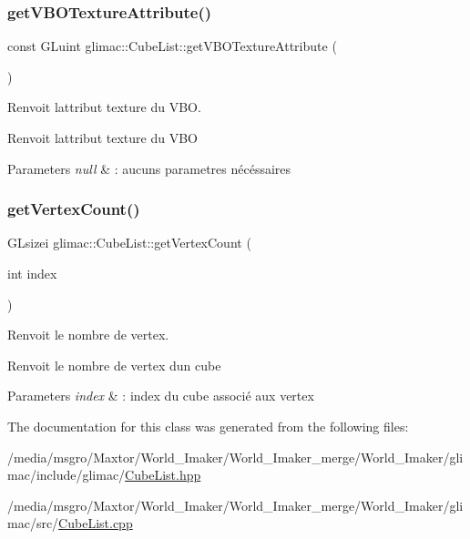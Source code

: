 \subsubsection{\texorpdfstring{get\+V\+B\+O\+Texture\+Attribute()}{getVBOTextureAttribute()}}
{\footnotesize\ttfamily const G\+Luint glimac\+::\+Cube\+List\+::get\+V\+B\+O\+Texture\+Attribute (\begin{DoxyParamCaption}{ }\end{DoxyParamCaption})\hspace{0.3cm}{\ttfamily [inline]}}



Renvoit l\textquotesingle{}attribut texture du V\+BO. 

Renvoit l\textquotesingle{}attribut texture du V\+BO


\begin{DoxyParams}{Parameters}
{\em null} & \+: aucuns parametres nécéssaires \\
\hline
\end{DoxyParams}
\mbox{\label{classglimac_1_1CubeList_aba84c9ac9d87bedca07244b8d4525c1d}} 
\subsubsection{\texorpdfstring{get\+Vertex\+Count()}{getVertexCount()}}
{\footnotesize\ttfamily G\+Lsizei glimac\+::\+Cube\+List\+::get\+Vertex\+Count (\begin{DoxyParamCaption}\item[{int}]{index }\end{DoxyParamCaption})\hspace{0.3cm}{\ttfamily [inline]}}



Renvoit le nombre de vertex. 

Renvoit le nombre de vertex d\textquotesingle{}un cube


\begin{DoxyParams}{Parameters}
{\em index} & \+: index du cube associé aux vertex \\
\hline
\end{DoxyParams}


The documentation for this class was generated from the following files\+:\begin{DoxyCompactItemize}
\item 
/media/msgro/\+Maxtor/\+World\+\_\+\+Imaker/\+World\+\_\+\+Imaker\+\_\+merge/\+World\+\_\+\+Imaker/glimac/include/glimac/\hyperlink{CubeList_8hpp}{Cube\+List.\+hpp}\item 
/media/msgro/\+Maxtor/\+World\+\_\+\+Imaker/\+World\+\_\+\+Imaker\+\_\+merge/\+World\+\_\+\+Imaker/glimac/src/\hyperlink{CubeList_8cpp}{Cube\+List.\+cpp}\end{DoxyCompactItemize}
